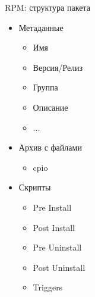 \begin{frame}{RPM: структура пакета}
	\begin{itemize}
		\item Метаданные
			\begin{itemize}
				\item Имя
				\item Версия/Релиз
				\item Группа
				\item Описание
				\item ...
			\end{itemize}
		\item Архив с файлами
			\begin{itemize}
				\item cpio
			\end{itemize}
		\item Скрипты
			\begin{itemize}
				\item Pre Install
				\item Post Install
				\item Pre Uninstall
				\item Post Uninstall \bigskip
				\item Triggers
			\end{itemize}
	\end{itemize}
\end{frame}
